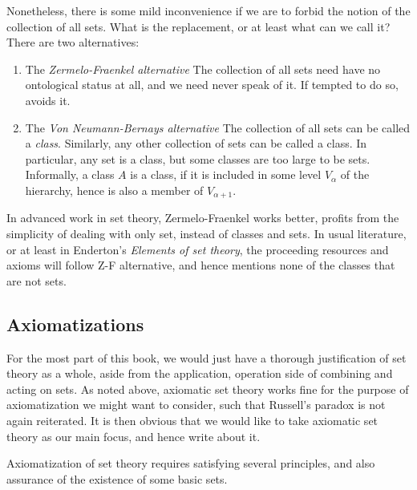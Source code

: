Nonetheless, there is some mild inconvenience if we are to forbid the notion of the collection of all sets. What is the replacement, or at least what can we call it? There are two alternatives: 
\begin{enumerate}
    \item The \textit{Zermelo-Fraenkel alternative } The collection of all sets need have no ontological status at all, and we need never speak of it. If tempted to do so, avoids it. 
    \item The \textit{Von Neumann-Bernays alternative } The collection of all sets can be called a \textit{class}. Similarly, any other collection of sets can be called a class. In particular, any set is a class, but some classes are too large to be sets. Informally, a class $A$ is a class, if it is included in some level $V_{\alpha}$ of the hierarchy, hence is also a member of $V_{\alpha +1}$. 
\end{enumerate}
In advanced work in set theory, Zermelo-Fraenkel works better, profits from the simplicity of dealing with only set, instead of classes and sets. In usual literature, or at least in Enderton's \textit{Elements of set theory}, the proceeding resources and axioms will follow Z-F alternative, and hence mentions none of the classes that are not sets.
\subsection{Axiomatizations}
For the most part of this book, we would just have a thorough justification of set theory as a whole, aside from the application, operation side of combining and acting on sets. As noted above, axiomatic set theory works fine for the purpose of axiomatization we might want to consider, such that Russell's paradox is not again reiterated. It is then obvious that we would like to take axiomatic set theory as our main focus, and hence write about it. 

Axiomatization of set theory requires satisfying several principles, and also assurance of the existence of some basic sets. 

